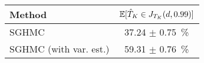 \begin{tabular}{lc}
\toprule
                Method & $\operatorname{\mathbb{E}}[\hat{T}_K \in J_{T_K}(d, {0.99})]$ \\
\midrule
                 SGHMC &                    37.24 $\pm$ 0.75~\% \\
SGHMC (with var. est.) &                    59.31 $\pm$ 0.76~\% \\
\bottomrule
\end{tabular}

